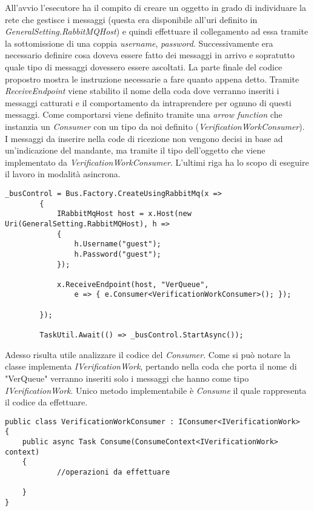 All'avvio l'esecutore ha il compito di creare un oggetto in grado di individuare la rete che gestisce i messaggi (questa era disponibile all'uri definito in \emph{GeneralSetting.RabbitMQHost}) e quindi effettuare il collegamento ad essa tramite la sottomissione di una coppia \emph{username}, \emph{password}.
Successivamente era necessario definire cosa doveva essere fatto dei messaggi in arrivo e sopratutto quale tipo di messaggi dovessero essere ascoltati. La parte finale del codice propostro mostra le instruzione necessarie a fare quanto appena detto. Tramite \emph{ReceiveEndpoint} viene stabilito il nome della coda dove verranno inseriti i messaggi catturati e il comportamento da intraprendere per ognuno di questi messaggi. Come comportarsi viene definito tramite una \emph{arrow function} che instanzia un \emph{Consumer} con un tipo da noi definito (\emph{VerificationWorkConsumer}). I messaggi da inserire nella code di ricezione non vengono decisi in base ad un'indicazione del mandante, ma tramite il tipo dell'oggetto che viene implementato da \emph{VerificationWorkConsumer}.
L'ultimi riga ha lo scopo di eseguire il lavoro in modalità asincrona.
\begin{lstlisting}[caption={creazione di un collegamento a \emph{RabbitMQ}}]
    _busControl = Bus.Factory.CreateUsingRabbitMq(x =>
        {
            IRabbitMqHost host = x.Host(new Uri(GeneralSetting.RabbitMQHost), h =>
            {
                h.Username("guest");
                h.Password("guest");
            });
            
            x.ReceiveEndpoint(host, "VerQueue",
                e => { e.Consumer<VerificationWorkConsumer>(); });
            
        });

        TaskUtil.Await(() => _busControl.StartAsync());
\end{lstlisting}

Adesso risulta utile analizzare il codice del \emph{Consumer}. Come si può notare la classe implementa \emph{IVerificationWork}, pertando nella coda che porta il nome di "VerQueue" verranno inseriti solo i messaggi che hanno come tipo \emph{IVerificationWork}.
Unico metodo implementabile è \emph{Consume} il quale rappresenta il codice da effettuare.

\begin{lstlisting}[caption={esempio di \emph{Consumer}}]
public class VerificationWorkConsumer : IConsumer<IVerificationWork>
{
    public async Task Consume(ConsumeContext<IVerificationWork> context)
    {
            //operazioni da effettuare

    }
}
\end{lstlisting}

